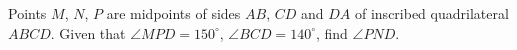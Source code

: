 \problem
Points $M$, $N$, $P$ are midpoints of sides $AB$, $CD$ and $DA$ of inscribed
quadrilateral $ABCD$.
Given that $\angle MPD = 150^\circ$, $\angle BCD = 140^\circ$, find
$\angle PND$.

\solution

\endproblem
